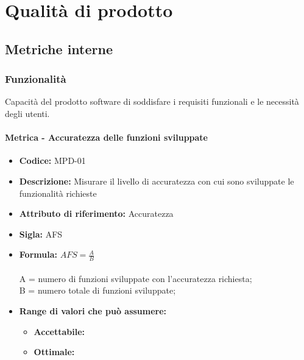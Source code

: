 
\section{Qualità di prodotto}
\subsection{Metriche interne}
 
  \subsubsection{Funzionalità}
      Capacità del prodotto software di soddisfare i requisiti funzionali e le necessità degli utenti.\\
      \paragraph{Metrica -  Accuratezza delle funzioni sviluppate} 
      \begin{itemize}
          \item  \textbf{Codice:} MPD-01
            \item  \textbf{Descrizione:} Misurare il livello di accuratezza con cui sono sviluppate le funzionalità richieste
            \item  \textbf{Attributo di riferimento:} Accuratezza 
           \item   \textbf{Sigla:} AFS
           \item   \textbf{Formula:} \begin{math}AFS = \frac{A}{B}\end{math}\\ \\
              A = numero di funzioni sviluppate con l'accuratezza richiesta;\\
              B = numero totale di funzioni sviluppate;
                    \item \textbf{Range di valori che può assumere:}
        \begin{itemize}
            \item \textbf{Accettabile:} 
            \item \textbf{Ottimale:} 
        \end{itemize}
       \end{itemize}
              

